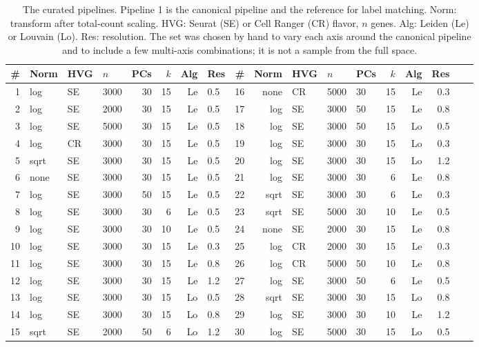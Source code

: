\begin{table}[t]
  \centering
  \caption{The \Nspecs{} curated pipelines. Pipeline 1 is the canonical
  pipeline and the reference for label matching. Norm: transform after
  total-count scaling. HVG: Seurat (SE) or Cell Ranger (CR) flavor, $n$
  genes. Alg: Leiden (Le) or Louvain (Lo). Res: resolution. The set was
  chosen by hand to vary each axis around the canonical pipeline and to
  include a few multi-axis combinations; it is not a sample from the full
  space.}
  \label{tab:curated}
  \footnotesize
  \setlength{\tabcolsep}{3.5pt}
  \begin{tabular}{@{}rlllrrrlr@{\hspace{14pt}}rlllrrrlr@{}}
    \toprule
    \# & Norm & HVG & $n$ & PCs & $k$ & Alg & Res & \# & Norm & HVG & $n$ & PCs & $k$ & Alg & Res \\
    \midrule
    1 & log & SE & 3000 & 30 & 15 & Le & 0.5 & 16 & none & CR & 5000 & 30 & 15 & Le & 0.3 \\
    2 & log & SE & 2000 & 30 & 15 & Le & 0.5 & 17 & log & SE & 3000 & 50 & 15 & Le & 0.8 \\
    3 & log & SE & 5000 & 30 & 15 & Le & 0.5 & 18 & log & SE & 3000 & 50 & 15 & Lo & 0.5 \\
    4 & log & CR & 3000 & 30 & 15 & Le & 0.5 & 19 & log & SE & 3000 & 30 & 15 & Lo & 0.3 \\
    5 & sqrt & SE & 3000 & 30 & 15 & Le & 0.5 & 20 & log & SE & 3000 & 30 & 15 & Lo & 1.2 \\
    6 & none & SE & 3000 & 30 & 15 & Le & 0.5 & 21 & log & SE & 3000 & 30 & 6 & Le & 0.8 \\
    7 & log & SE & 3000 & 50 & 15 & Le & 0.5 & 22 & sqrt & SE & 3000 & 30 & 6 & Le & 0.3 \\
    8 & log & SE & 3000 & 30 & 6 & Le & 0.5 & 23 & sqrt & SE & 5000 & 30 & 10 & Le & 0.5 \\
    9 & log & SE & 3000 & 30 & 10 & Le & 0.5 & 24 & none & SE & 2000 & 30 & 15 & Le & 0.8 \\
    10 & log & SE & 3000 & 30 & 15 & Le & 0.3 & 25 & log & CR & 2000 & 30 & 15 & Le & 0.3 \\
    11 & log & SE & 3000 & 30 & 15 & Le & 0.8 & 26 & log & CR & 5000 & 50 & 10 & Le & 0.8 \\
    12 & log & SE & 3000 & 30 & 15 & Le & 1.2 & 27 & log & SE & 3000 & 50 & 6 & Le & 0.5 \\
    13 & log & SE & 3000 & 30 & 15 & Lo & 0.5 & 28 & sqrt & SE & 3000 & 30 & 15 & Lo & 0.8 \\
    14 & log & SE & 3000 & 30 & 15 & Lo & 0.8 & 29 & log & SE & 3000 & 30 & 10 & Le & 1.2 \\
    15 & sqrt & SE & 2000 & 50 & 6 & Lo & 1.2 & 30 & log & SE & 5000 & 30 & 15 & Lo & 0.5 \\
    \bottomrule
  \end{tabular}
\end{table}


